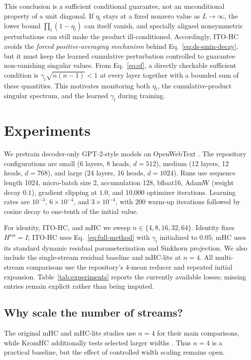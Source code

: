 \documentclass{article}
\newcommand{\Hres}{H^{\mathrm{res}}}
\begin{document}
This conclusion is a sufficient conditional guarantee, not an unconditional property of a unit diagonal. If $\eta_l$ stays at a fixed nonzero value as $L\to\infty$, the lower bound $\prod_l(1-\eta_l)$ can itself vanish, and specially aligned nonsymmetric perturbations can still make the product ill-conditioned. Accordingly, ITO-HC avoids the \emph{forced positive-averaging mechanism} behind Eq.~\ref{eq:ds-smin-decay}, but it must keep the learned cumulative perturbation controlled to guarantee non-vanishing singular values. From Eq.~\ref{eq:ef}, a directly checkable sufficient condition is $\gamma_l\sqrt{n(n-1)}<1$ at every layer together with a bounded sum of these quantities. This motivates monitoring both $\eta_l$, the cumulative-product singular spectrum, and the learned $\gamma_l$ during training.

\section{Experiments}
\label{sec:experiments}

We pretrain decoder-only GPT-2-style models on OpenWebText \citep{gokaslan2019openwebtext}. The repository configurations are small (6 layers, 8 heads, $d=512$), medium (12 layers, 12 heads, $d=768$), and large (24 layers, 16 heads, $d=1024$). Runs use sequence length 1024, micro-batch size 2, accumulation 128, bfloat16, AdamW (weight decay $0.1$), gradient clipping at $1.0$, and 10,000 optimizer iterations. Learning rates are $10^{-3}$, $6\times10^{-4}$, and $3\times10^{-4}$, with 200 warm-up iterations followed by cosine decay to one-tenth of the initial value.

For identity, ITO-HC, and mHC we sweep $n\in\{4,8,16,32,64\}$. Identity fixes $\Hres=I$; ITO-HC uses Eq.~\ref{eq:full-method} with $\gamma_l$ initialized to $0.05$; mHC uses its standard dynamic residual parameterization and Sinkhorn projection. We also include the single-stream residual baseline and mHC-lite at $n=4$. All multi-stream comparisons use the repository's $4$-mean reducer and repeated initial expansion. Table~\ref{tab:experiments} reports the currently available losses; missing entries remain explicit rather than being imputed.

\subsection{Why scale the number of streams?}
The original mHC and mHC-lite studies use $n=4$ for their main comparisons, while KromHC additionally tests selected larger widths \citep{xie2026mhc,yang2026mhclite,zhou2026kromhc}. Thus $n=4$ is a practical baseline, but the effect of controlled width scaling remains open.
\end{document}
